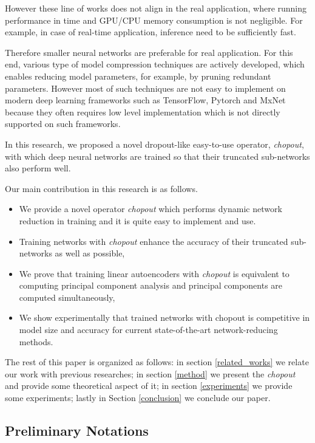 \documentclass{article}
\begin{document}
    However these line of works does not align in the real application, where running performance in time and GPU/CPU memory consumption is not negligible. For example, in case of real-time application, inference need to be sufficiently fast. 

    Therefore smaller neural networks are preferable for real application. For this end, various type of model compression techniques are actively developed, which enables reducing model parameters, for example, by pruning redundant parameters. However most of such techniques are not easy to implement on modern deep learning frameworks such as TensorFlow, Pytorch and MxNet because they often requires low level implementation which is not directly supported on such frameworks.

    In this research, we proposed a novel dropout-like easy-to-use operator, \textit{chopout}, with which deep neural networks are trained so that their truncated sub-networks also perform well. 

        
    Our main contribution in this research is as follows.
    \begin{itemize} 
      \item We provide a novel operator \textit{chopout} which performs dynamic network reduction in training and it is quite easy to implement and use.      
      \item Training networks with \textit{chopout} enhance the accuracy of their truncated sub-networks as well as possible,
      \item We prove that training linear autoencoders with \textit{chopout} is equivalent to computing principal component analysis and
      principal components are computed simultaneously, 
      \item We show experimentally that trained networks with chopout is competitive in model size and accuracy for current state-of-the-art network-reducing methods.
    \end{itemize}

    The rest of this paper is organized as follows: 
    in section \ref{related_works} we relate our work with previous researches;
    in section \ref{method} we present the \textit{chopout} and provide some theoretical aspect of it; 
    in section \ref{experiments} we provide some experiments; 
    lastly in Section \ref{conclusion} we conclude our paper. 

    \subsection{Preliminary Notations}
    \label{preliminary_notations}
    
\end{document}
